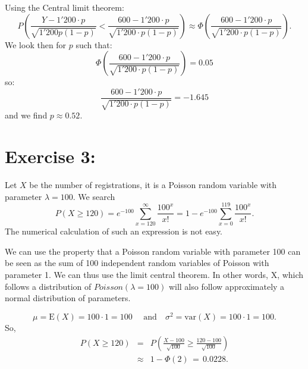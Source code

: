 \documentclass[12pt,thmsa]{article}
\begin{document}
Using the Central limit theorem:
$$
P\left(\frac{Y-1'200\cdot p}{\sqrt{1'200p(1-p)}} < \frac{600 -
1'200\cdot p}{\sqrt{1'200\cdot p(1-p)}}\right) \approx \Phi\left(\frac{600 -
1'200\cdot p}{\sqrt{1'200\cdot p(1-p)}}\right).
$$
We look then for $p$ such that:
$$
\Phi\left(\frac{600 - 1'200\cdot p}{\sqrt{1'200\cdot p(1-p)}}\right) = 0.05
$$
so:
$$
\frac{600 - 1'200\cdot p}{\sqrt{1'200\cdot p(1-p)}} = -1.645
$$
and we find $p \approx 0.52.$




\section*{Exercise 3:}

Let $ X $ be the number of registrations, it is a Poisson random variable with parameter $ \lambda = 100 $. We search
$$
P(X \geq 120) = e^{-100}\sum_{x=120}^\infty \frac{100^x}{x!} = 1 -
e^{-100}\sum_{x=0}^{119} \frac{100^x}{x!}.
$$
The numerical calculation of such an expression is not easy.

We can use the property that a Poisson random variable with parameter 100 can be seen as the sum of 100 independent random variables of Poisson with parameter 1. We can thus use the limit central theorem. In other words, X, which follows a distribution of $Poisson(\lambda = 100)$ will also follow approximately a normal distribution of parameters.

$$
\mu = \text{E}(X) = 100 \cdot 1 = 100 \quad \mbox{ and} \quad \sigma^2 =
\text{var}(X) = 100 \cdot 1 =100.
$$
So,
\begin{eqnarray}
\nonumber P( X \geq 120) &=& P\left(\frac{X - 100}{\sqrt{100}} \geq
\frac{120 - 100}{\sqrt{100}}\right) \\
\nonumber &\approx& 1 - \Phi(2) \, = \,  0.0228.
\end{eqnarray}
\end{document}
